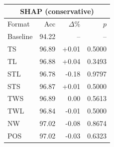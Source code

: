 \begin{tabular}{lrrr}
\toprule
\multicolumn{4}{c}{\textbf{SHAP (conservative)}} \\
\midrule
Format & Acc & $\Delta$\% & $p$ \\
\midrule
Baseline & 94.22 & -- & -- \\
\midrule
TS & 96.89 & +0.01 & 0.5000 \\
TL & 96.88 & +0.04 & 0.3493 \\
STL & 96.78 & -0.18 & 0.9797 \\
STS & 96.87 & +0.01 & 0.5000 \\
TWS & 96.89 & 0.00 & 0.5613 \\
TWL & 96.84 & -0.01 & 0.5000 \\
NW & 97.02 & -0.08 & 0.8674 \\
POS & 97.02 & -0.03 & 0.6323 \\
\bottomrule
\end{tabular}
